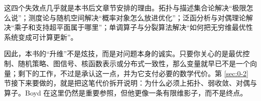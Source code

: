 \begin{remark}
这四个失效点几乎就是本书后文章节安排的理由。拓扑与描述集合论解决“极限怎么说”；测度论与随机空间解决“概率对象怎么放进优化”；泛函分析与对偶理论解决“乘子和支持超平面属于哪里”；单调算子与分裂算法解决“如何把无穷维最优性系统变成可计算更新”。
\end{remark}

因此，本书的“升维”不是炫技，而是对问题本身的诚实。只要你关心的是最优控制、随机策略、图信号、核函数表示或分布式一致性，那么变量就早已不是一个向量；剩下的工作，不过是承认这一点，并为它支付必要的数学代价。第 \ref{sec:0-2} 节接下来要做的，就是把这笔代价拆开说明：为什么必须上拓扑、弱收敛、对偶与算子。Boyd 在这里仍然是重要参照，但他更像一条有限维影子，而不是终点。
